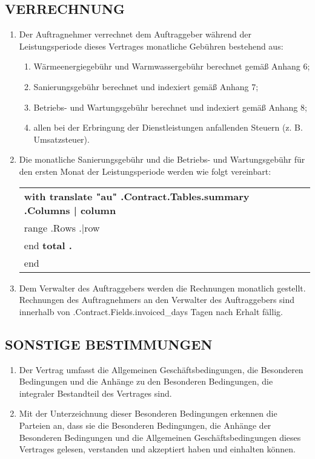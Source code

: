 \subsection{VERRECHNUNG}
\begin{enumerate}
	\item Der Auftragnehmer verrechnet dem Auftraggeber während der Leistungsperiode dieses Vertrages monatliche Gebühren bestehend aus:
	\begin{enumerate}
		\item Wärmeenergiegebühr und Warmwassergebühr berechnet gemäß Anhang 6;
		\item Sanierungsgebühr berechnet und indexiert gemäß Anhang 7;
		\item Betriebs- und Wartungsgebühr berechnet und indexiert gemäß Anhang 8;
		\item allen bei der Erbringung der Dienstleistungen anfallenden Steuern (z. B. Umsatzsteuer).
	\end{enumerate}
	\item Die monatliche Sanierungsgebühr und die Betriebs- und Wartungsgebühr für den ersten Monat der Leistungsperiode werden wie folgt vereinbart:


\begin{center}
	\begin{tabu}{|X|X|X|X|}\tabucline{}\rowfont[c]\bfseries
	{{with translate "au" .Contract.Tables.summary}} %
	{{.Columns | column}} \\\tabucline{}
	{{range .Rows}} %
	{{.|row}} \\\tabucline{}
	{{end}}
	\bfseries {{total .}} \\\tabucline{} %
	{{end}}
	\end{tabu}
\end{center}

\item Dem Verwalter des Auftraggebers werden die Rechnungen monatlich gestellt. Rechnungen des Auftragnehmers an den Verwalter des Auftraggebers sind innerhalb von \iffalse input fields.invoiced_days value="{{.Contract.Fields.invoiced_days}}" \fi {{.Contract.Fields.invoiced_days}} Tagen nach Erhalt fällig.
\end{enumerate}

\subsection{SONSTIGE BESTIMMUNGEN}
\begin{enumerate}
\item Der Vertrag umfasst die Allgemeinen Geschäftsbedingungen, die Besonderen Bedingungen und die Anhänge zu den Besonderen Bedingungen, die integraler Bestandteil des Vertrages sind.
\item Mit der Unterzeichnung dieser Besonderen Bedingungen erkennen die Parteien an, dass sie die Besonderen Bedingungen, die Anhänge der Besonderen Bedingungen und die
  Allgemeinen Geschäftsbedingungen dieses Vertrages gelesen, verstanden und akzeptiert haben und einhalten können.
\end{enumerate}

